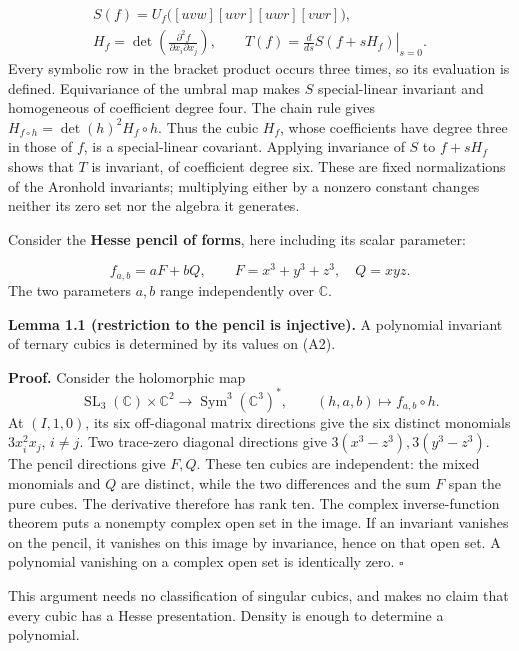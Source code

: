 \documentclass[
]{article}
\newcounter{none} %
\begin{document}
\[
\begin{gathered}
S(f)=U_f\bigl([uvw][uvr][uwr][vwr]\bigr),\\
H_f=\det\left(\frac{\partial^2f}{\partial x_i\partial x_j}\right),\qquad
T(f)=\left.\frac{d}{ds}S(f+sH_f)\right|_{s=0}.
\end{gathered}
\tag{A1}
\] Every symbolic row in the bracket product occurs three times, so its
evaluation is defined. Equivariance of the umbral map makes \(S\)
special-linear invariant and homogeneous of coefficient degree four. The
chain rule gives \(H_{f\circ h}=\det(h)^2H_f\circ h\). Thus the cubic
\(H_f\), whose coefficients have degree three in those of \(f\), is a
special-linear covariant. Applying invariance of \(S\) to \(f+sH_f\)
shows that \(T\) is invariant, of coefficient degree six. These are
fixed normalizations of the Aronhold invariants; multiplying either by a
nonzero constant changes neither its zero set nor the algebra it
generates.

Consider the \textbf{Hesse pencil of forms}, here including its scalar
parameter: \protect{}\label{equation-A2}{}

\[
f_{a,b}=aF+bQ,\qquad F=x^3+y^3+z^3,\quad Q=xyz.
\tag{A2}
\] The two parameters \(a,b\) range independently over \(\mathbb C\).

\protect{}\label{lemma-1-1}{}

\textbf{Lemma 1.1 (restriction to the pencil is injective).} A
polynomial invariant of ternary cubics is determined by its values on
(A2).

\textbf{Proof.} Consider the holomorphic map \[
\operatorname{SL}_3(\mathbb C)\times\mathbb C^2
\longrightarrow \operatorname{Sym}^3(\mathbb C^3)^*,
\qquad (h,a,b)\longmapsto f_{a,b}\circ h.
\] At \((I,1,0)\), its six off-diagonal matrix directions give the six
distinct monomials \(3x_i^2x_j\), \(i\ne j\). Two trace-zero diagonal
directions give \(3(x^3-z^3),3(y^3-z^3)\). The pencil directions give
\(F,Q\). These ten cubics are independent: the mixed monomials and \(Q\)
are distinct, while the two differences and the sum \(F\) span the pure
cubes. The derivative therefore has rank ten. The complex
inverse-function theorem puts a nonempty complex open set in the image.
If an invariant vanishes on the pencil, it vanishes on this image by
invariance, hence on that open set. A polynomial vanishing on a complex
open set is identically zero. \(\square\)

This argument needs no classification of singular cubics, and makes no
claim that every cubic has a Hesse presentation. Density is enough to
determine a polynomial.
\end{document}
